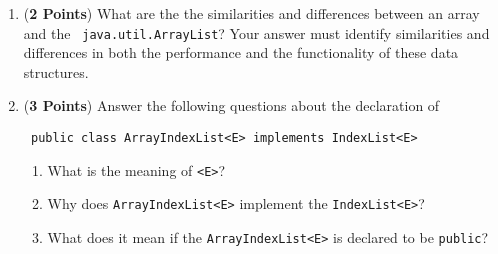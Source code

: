 \documentclass[12pt]{article}
\begin{document}
\begin{enumerate}
\begin{enumerate}

  \item ({\bf 2 Points}) What are the the similarities and differences between an array and the {\tt
  java.util.ArrayList}?  Your answer must identify similarities and differences in both the performance and the
  functionality of these data structures.



  \item ({\bf 3 Points}) Answer the following questions about the declaration of

    {\tt
      public class ArrayIndexList<E> implements IndexList<E>}

    \begin{enumerate}

      \item What is the meaning of {\tt <E>}?

      \item Why does {\tt ArrayIndexList<E>} implement the  {\tt IndexList<E>}?

      \item What does it mean if the {\tt ArrayIndexList<E>} is declared to be {\tt public}?


\end{enumerate}
\end{enumerate}
\end{enumerate}
\end{document}
